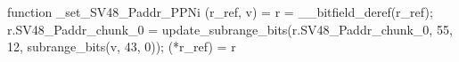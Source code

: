 function _set_SV48_Paddr_PPNi (r_ref, v) = {
    r = __bitfield_deref(r_ref);
    r.SV48_Paddr_chunk_0 = update_subrange_bits(r.SV48_Paddr_chunk_0, 55, 12, subrange_bits(v, 43, 0));
    (*r_ref) = r
}
